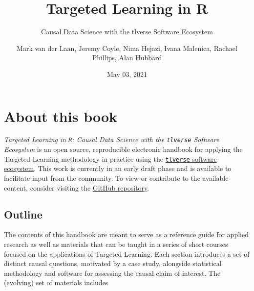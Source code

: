 \documentclass[12pt, krantz2,]{krantz}
\title{Targeted Learning in R}
\subtitle{Causal Data Science with the tlverse Software Ecosystem}
\author{Mark van der Laan, Jeremy Coyle, Nima Hejazi, Ivana Malenica, Rachael Phillips, Alan Hubbard}
\date{May 03, 2021}
\newcommand{\passthrough}[1]{#1}
\theoremstyle{definition}
\theoremstyle{definition}
\theoremstyle{definition}
\newcommand{\1}{\mathbbm{1}}
\begin{document}
\maketitle


\thispagestyle{empty}

\begin{center}
\end{center}

\setlength{\abovedisplayskip}{-5pt}
\setlength{\abovedisplayshortskip}{-5pt}

\mainmatter

{
\hypersetup{linkcolor=}
\setcounter{tocdepth}{2}
\tableofcontents
}
\hypertarget{about-this-book}{%
\chapter*{About this book}\label{about-this-book}}


\emph{Targeted Learning in \passthrough{\lstinline!R!}: Causal Data Science with the \passthrough{\lstinline!tlverse!} Software
Ecosystem} is an open source, reproducible electronic handbook for applying the
Targeted Learning methodology in practice using the \href{https://github.com/tlverse}{\passthrough{\lstinline!tlverse!} software
ecosystem}. This work is currently in an early draft
phase and is available to facilitate input from the community. To view or
contribute to the available content, consider visiting the \href{https://github.com/tlverse/tlverse-handbook}{GitHub
repository}.

\hypertarget{outline}{%
\section{Outline}\label{outline}}

The contents of this handbook are meant to serve as a reference guide for
applied research as well as materials that can be taught in a series of short
courses focused on the applications of Targeted Learning. Each section
introduces a set of distinct causal questions, motivated by a case study,
alongside statistical methodology and software for assessing the causal claim of
interest. The (evolving) set of materials includes
\end{document}
